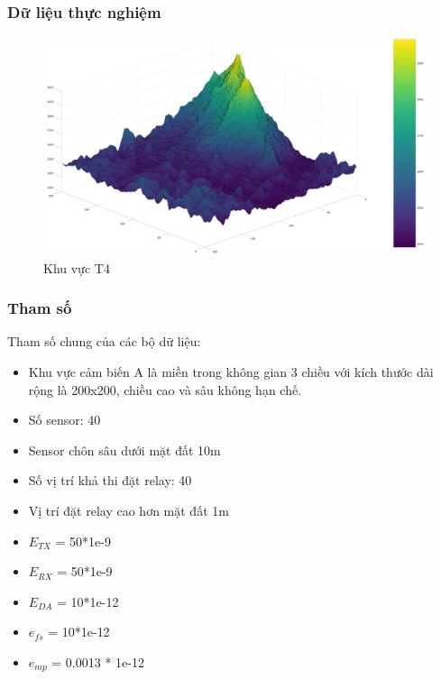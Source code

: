 \begin{frame}
    \frametitle{Dữ liệu thực nghiệm}

    \begin{figure}
        \includegraphics[width=\linewidth]{picture/Selection_038.png}
        \caption{Khu vực T4}
    \end{figure}
\end{frame}

\begin{frame}
    \frametitle{Tham số}
    Tham số chung của các bộ dữ liệu:
    \begin{itemize}
        \item Khu vực cảm  biến A là miền trong không gian 3 chiều với kích thước dài rộng là 200x200, chiều cao và sâu không hạn chế.
        \item Số sensor: 40  
        \item Sensor chôn sâu dưới mặt đất 10m
        \item Số vị trí khả thi đặt relay: 40 
        \item Vị trí đặt relay cao hơn mặt đất 1m
        \item $E_{TX}$ = 50*1e-9
        \item $E_{RX}$ = 50*1e-9
        \item $E_{DA}$ = 10*1e-12
        \item $e_{fs}$ = 10*1e-12
        \item $e_{mp}$ = 0.0013 * 1e-12
    \end{itemize}
\end{frame}

